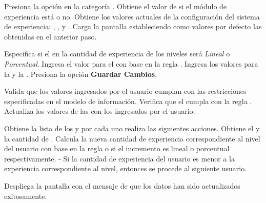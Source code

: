 \begin{UCtrayectoria}%
%
   

  \Actor Presiona la opción {\bf {}} en la categoría
         .  
  \Sistema Obtiene el valor de si el módulo de experiencia está  o no.  \label{CU-E02-2-loading}
  \Sistema Obtiene los valores actuales de la configuración del sistema de experiencia:
           ,
           ,
            y
           .
  \Sistema Carga la pantalla  estableciendo como valores por defecto
           las  obtenidas en el anterior paso.

  \Actor Especifica si el  en la cantidad de
         experiencia de los niveles será {\it Lineal} o {\it Porcentual}.
  \Actor Ingresa el valor para el  con
         base en la regla .
  \Actor Ingresa los valores para la  y la
         .
  \Actor Presiona la opción {\bf Guardar Cambios}.  \label{CU-E02-2-submit}

  \Sistema Valida que los valores ingresados por el usuario cumplan con las
           restricciones especificadas en el modelo de información.
  \Sistema Verifica que el  cumpla
           con la regla . 
  \Sistema Actualiza los valores de las  con los
           ingresados por el usuario.

  \Sistema Obtiene la lista de los  y por cada uno
           realiza las siguientes acciones.
  \Sistema Obtiene el  y la cantidad de .
  \Sistema Calcula la nueva cantidad de experiencia correspondiente al nivel del usuario con
           base en la regla  o  si el incremento es lineal o
           porcentual respectivamente.
  \Sistema - Si la cantidad de experiencia del usuario es menor a la experiencia correspondiente
           al nivel, entonces se procede al siguiente usuario.  \label{CU-E02-2-Usuarios}

  \Sistema Despliega la pantalla  con el mensaje de que los datos
           han sido actualizados exitosamente.

\end{UCtrayectoria}

